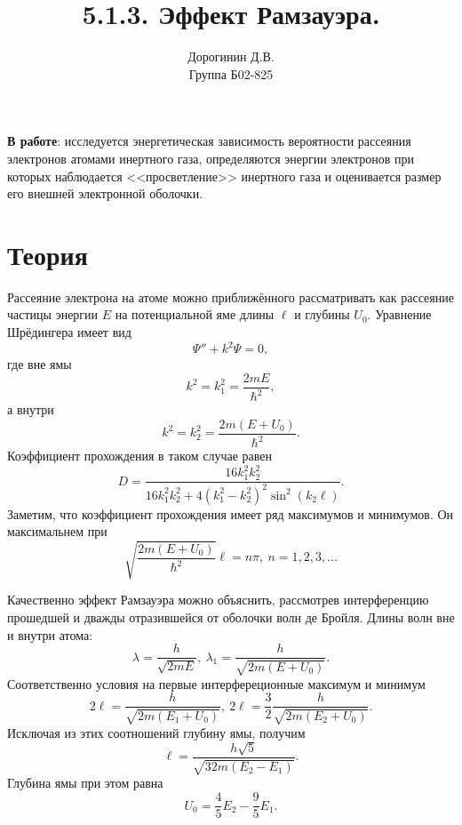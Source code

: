 \documentclass[a4paper,12pt]{article}
\author{Дорогинин Д.В.\\
Группа Б02-825}
\title{5.1.3. Эффект Рамзауэра.}
\date{}
\begin{document}
\maketitle
\textbf{В работе}: исследуется энергетическая зависимость вероятности рассеяния электронов атомами инертного газа, определяются энергии электронов при которых наблюдается <<просветление>> инертного газа и оценивается размер его внешней электронной оболочки.

\section*{Теория}
Рассеяние электрона на атоме можно приближённого рассматривать как рассеяние частицы энергии $E$ на потенциальной яме длины $\ell$ и глубины $U_0$. Уравнение Шрёдингера имеет вид
\[\Psi'' + k^2 \Psi = 0,\]
где вне ямы 
\[k^2 = k_1^2 = \dfrac{2mE}{\hbar^2},\]
а внутри 
\[k^2 = k_2^2 = \dfrac{2m(E+U_0)}{\hbar^2}.\]
Коэффициент прохождения в таком случае равен
\[D = \dfrac{16 k_1^2 k_2^2}{16k_1^2 k_2^2 + 4(k_1^2 - k_2^2)^2\sin^2(k_2\ell)}.\]
Заметим, что коэффициент прохождения имеет ряд максимумов и минимумов. Он максимальнем при
\begin{equation}\label{0}
\sqrt{\dfrac{2m(E+U_0)}{\hbar^2}}\ell = n\pi,~n=1,2,3,\dots
\end{equation}

Качественно эффект Рамзауэра можно объяснить, рассмотрев интерференцию прошедшей и дважды отразившейся от оболочки волн де Бройля. Длины волн вне и внутри атома:
\[\lambda = \dfrac{h}{\sqrt{2mE}},~\lambda_1 = \dfrac{h}{\sqrt{2m(E+U_0)}}.\]
Соответственно условия на первые интерфереционные максимум и минимум 
\begin{equation}\label{1}
2\ell = \dfrac{h}{\sqrt{2m(E_1 + U_0)}},~2\ell = \dfrac{3}{2}\dfrac{h}{\sqrt{2m(E_2 + U_0)}}.
\end{equation}
Исключая из этих соотношений глубину ямы, получим
\begin{equation}\label{2}
\ell = \dfrac{h\sqrt{5}}{\sqrt{32m(E_2 - E_1)}}.
\end{equation}
Глубина ямы при этом равна
\begin{equation}\label{4}
U_0 = \dfrac{4}{5}E_2 - \dfrac{9}{5}E_1.
\end{equation}
\end{document}
